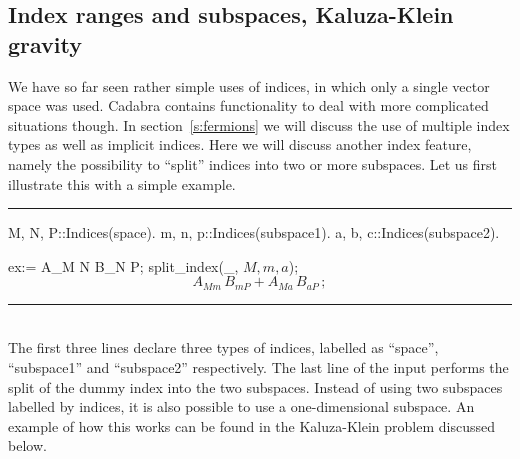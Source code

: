 \documentclass[11pt]{article}
\newcommand{\toprule}{\par\vspace{1ex}\noindent\hspace{25pt}\rule{435pt}{.1pt}}
\newcommand{\botrule}{\noindent\hspace{25pt}\rule{435pt}{.1pt}\\[2ex]}
\newenvironment{cdbin}{\fvset{firstnumber=1}\color[named]{Blue}\Verbatim}{\endVerbatim}
\newenvironment{cdbout}{\vspace{-1ex}\begin{equation}}{\end{equation}\vspace{-1ex}}
\newcommand{\Cdb}{{Cadabra}\xspace}
\begin{document}
\subsection{Index ranges and subspaces, Kaluza-Klein gravity}
\label{s:example2}

We have so far seen rather simple uses of indices, in which only a
single vector space was used. \Cdb contains functionality to deal with
more complicated situations though. In section~\ref{s:fermions} we
will discuss the use of multiple index types as well as implicit
indices. Here we will discuss another index feature, namely the
possibility to ``split'' indices into two or more subspaces. Let us
first illustrate this with a simple example.
\toprule
\begin{cdbin}
{M, N, P}::Indices(space).
{m, n, p}::Indices(subspace1).
{a, b, c}::Indices(subspace2).

ex:= A_{M N} B_{N P};
split_index(_, $M, m, a$);
\end{cdbin}
\begin{cdbout}
A_{M m} \, B_{m P} + A_{M a}\, B_{a P}\,;
\end{cdbout}
\botrule 
The first three lines declare three types of indices, labelled as
``space'', ``subspace1'' and ``subspace2'' respectively. The last line
of the input performs the split of the dummy index into the two
subspaces. Instead of using two subspaces labelled by indices, it is
also possible to use a one-dimensional subspace. An example of how
this works can be found in the Kaluza-Klein problem discussed below.
\end{document}
